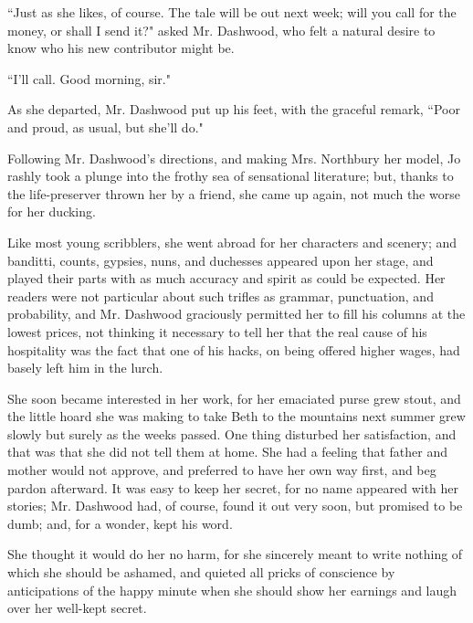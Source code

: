 ``Just as she likes, of course. The tale will be out next week; will you
call for the money, or shall I send it?" asked Mr. Dashwood, who felt a
natural desire to know who his new contributor might be.

``I'll call. Good morning, sir."

As she departed, Mr. Dashwood put up his feet, with the graceful remark,
``Poor and proud, as usual, but she'll do."

Following Mr. Dashwood's directions, and making Mrs.
Northbury her model, Jo rashly took a plunge into the frothy sea of
sensational literature; but, thanks to the life-preserver thrown her by
a friend, she came up again, not much the worse for her ducking.

Like most young scribblers, she went abroad for her characters and
scenery; and banditti, counts, gypsies, nuns, and duchesses appeared
upon her stage, and played their parts with as much accuracy and spirit
as could be expected. Her readers were not particular about such trifles
as grammar, punctuation, and probability, and Mr. Dashwood graciously
permitted her to fill his columns at the lowest prices, not thinking it
necessary to tell her that the real cause of his hospitality was the
fact that one of his hacks, on being offered higher wages, had basely
left him in the lurch.

She soon became interested in her work, for her emaciated purse grew
stout, and the little hoard she was making to take Beth to the mountains
next summer grew slowly but surely as the weeks passed. One thing
disturbed her satisfaction, and that was that she did not tell them at
home. She had a feeling that father and mother would not approve, and
preferred to have her own way first, and beg pardon afterward. It was
easy to keep her secret, for no name appeared with her stories; Mr.
Dashwood had, of course, found it out very soon, but promised to be
dumb; and, for a wonder, kept his word.

She thought it would do her no harm, for she sincerely meant to write
nothing of which she should be ashamed, and quieted all pricks of
conscience by anticipations of the happy minute when she should show her
earnings and laugh over her well-kept secret.

